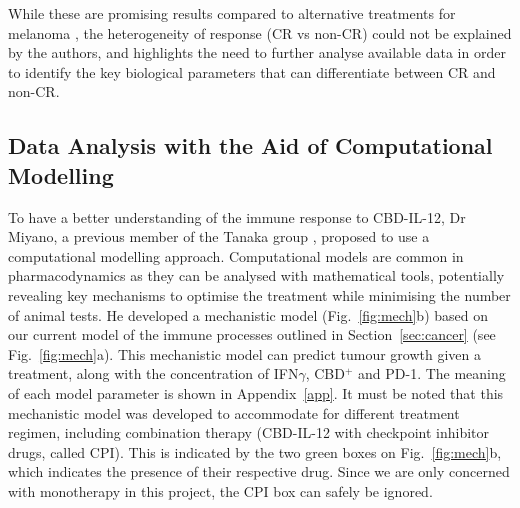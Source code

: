 \documentclass[11pt]{article}
\begin{document}
While these are promising results compared to alternative treatments for melanoma \cite{reviewImmunoMelanoma}, the heterogeneity of response (CR vs non-CR) could not be explained by the authors, and highlights the need to further analyse available data in order to identify the key biological parameters that can differentiate between CR and non-CR.

\subsection{Data Analysis with the Aid of Computational Modelling}\label{ssec:prevWork}

To have a better understanding of the immune response to CBD-IL-12, Dr Miyano, a previous member of the Tanaka group \cite{takuya}, proposed to use a computational modelling approach. Computational models are common in pharmacodynamics as they can be analysed with mathematical tools, potentially revealing key mechanisms to optimise the treatment while minimising the number of animal tests. He developed a mechanistic model (Fig.~\ref{fig:mech}b) based on our current model of the immune processes outlined in Section~\ref{sec:cancer} (see Fig.~\ref{fig:mech}a). This mechanistic model can predict tumour growth given a treatment, along with the concentration of IFN$\gamma$, CBD$^+$ and PD-1. The meaning of each model parameter is shown in Appendix~\ref{app}. It must be noted that this mechanistic model was developed to accommodate for different treatment regimen, including combination therapy (CBD-IL-12 with checkpoint inhibitor drugs, called CPI). This is indicated by the two green boxes on Fig.~\ref{fig:mech}b, which indicates the presence of their respective drug. Since we are only concerned with monotherapy in this project, the CPI box can safely be ignored.
\end{document}
